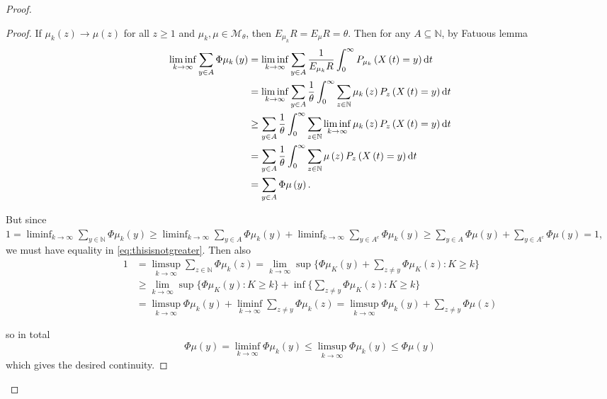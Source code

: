 \documentclass[12pt,a4paper]{scrartcl}
\numberwithin{equation}{section}
\newcommand{\N}{\mathbb{N}} %
\begin{document}
\begin{proof}
\begin{proof}
If $ \mu_k\left(z\right) \to \mu\left(z\right) $ for all $ z \geq 1 $ and $\mu_k, \mu \in \mathcal{M}_{\theta}$, then $ E_{\mu_k} R = E_{\mu} R = \theta $.
Then for any $ A \subseteq \N $, by Fatuous lemma
\begin{equation}
\label{eq:thisisnotgreater}
\begin{aligned}
\liminf_{k \to \infty} \sum_{y \in A} \Phi\mu_k\left(y\right) &= \liminf_{k \to \infty} \sum_{y \in A} \frac{1}{E_{\mu_k}R} \int_0^{\infty} P_{\mu_k}\left(X\left(t\right) = y\right) \textnormal{d}t \\
&= \liminf_{k \to \infty} \sum_{y \in A} \frac{1}{\theta} \int_0^{\infty} \sum_{z \in \N} \mu_k\left(z\right) P_z\left(X\left(t\right) = y\right) \textnormal{d}t \\
&\geq  \sum_{y \in A} \frac{1}{\theta} \int_0^{\infty} \sum_{z \in \N} \liminf_{k \to \infty} \mu_k\left(z\right) P_z\left(X\left(t\right) = y\right) \textnormal{d}t \\
&= \sum_{y \in A} \frac{1}{\theta} \int_0^{\infty} \sum_{z \in \N} \mu\left(z\right) P_z\left(X\left(t\right) = y\right) \textnormal{d}t \\
&= \sum_{y \in A} \Phi\mu\left(y\right).
\end{aligned}
\end{equation}

But since $ 1 = \liminf_{k \to \infty} \sum_{y \in \N} \Phi\mu_k\left(y\right) \geq \liminf_{k \to \infty} \sum_{y \in A} \Phi\mu_k\left(y\right) + \liminf_{k \to \infty} \sum_{y \in A^c} \Phi\mu_k\left(y\right) \geq \sum_{y \in A} \Phi\mu\left(y\right) + \sum_{y \in A^c} \Phi\mu\left(y\right) = 1 $, we must have equality in \eqref{eq:thisisnotgreater}.
Then also
\begin{align*}
1 &= \limsup_{k \to \infty} \sum_{z \in \N} \Phi\mu_k\left(z\right) = \lim_{k \to \infty} \sup\lbrace \Phi\mu_K\left(y\right) + \sum_{z\neq y}\Phi\mu_K\left(z\right): K \geq k \rbrace  \\
&\geq \lim_{k \to \infty} \sup\lbrace \Phi\mu_K\left(y\right):K \geq k\rbrace  + \inf\lbrace \sum_{z\neq y}\Phi\mu_K\left(z\right):K \geq k \rbrace \\
&= \limsup_{k \to \infty} \Phi\mu_k\left(y\right) + \liminf_{k \to \infty} \sum_{z \neq y} \Phi\mu_k\left(z\right) = \limsup_{k \to \infty} \Phi\mu_k\left(y\right) + \sum_{z \neq y} \Phi\mu\left(z\right)
\end{align*}

so in total
$$ \Phi\mu\left(y\right) = \liminf_{k \to \infty} \Phi\mu_k\left(y\right) \leq \limsup_{k \to \infty} \Phi\mu_k\left(y\right) \leq \Phi\mu\left(y\right) $$
which gives the desired continuity.
\end{proof}



\end{proof}
\end{document}
